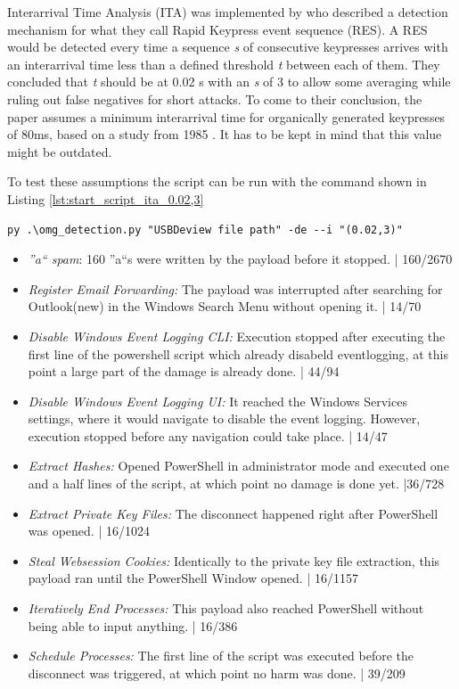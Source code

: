 Interarrival Time Analysis (ITA) was implemented by \cite{neunerUSBlockBlockingUSBBased2018} who described a detection mechanism for what they call Rapid Keypress event sequence (RES). A RES would be detected every time a sequence \emph{s} of consecutive keypresses arrives with an interarrival time less than a defined threshold \emph{t} between each of them. They concluded that \emph{t} should be at 0.02 s with an \emph{s} of 3 to allow some averaging while ruling out false negatives for short attacks. To come to their conclusion, the paper assumes a minimum interarrival time for organically generated keypresses of 80ms, based on a study from 1985 \cite{umphressIdentityVerificationKeyboard1985}. It has to be kept in mind that this value might be outdated.

To test these assumptions the script can be run with the command shown in Listing \ref{lst:start_script_ita_0.02,3}


\begin{lstlisting}[caption={start Defense Script with ITA (0.02,3)},label={lst:start_script_ita_0.02,3}, captionpos=b]
 py .\omg_detection.py "USBDeview file path" -de --i "(0.02,3)"
\end{lstlisting}

\begin{itemize}
    \item  \emph{''a`` spam}: 160 ''a``s were written by the payload before it stopped. | 160/2670
    \item  \emph{Register Email Forwarding:} The payload was interrupted after searching for Outlook(new) in the Windows Search Menu without opening it.  | 14/70 
    \item  \emph{Disable Windows Event Logging CLI:} Execution stopped after executing the first line of the powershell script which already disabeld eventlogging, at this point a large part of the damage is already done. | 44/94
    \item  \emph{Disable Windows Event Logging UI:} It reached the Windows Services settings, where it would navigate to disable the event logging. However, execution stopped before any navigation could take place.  | 14/47
    \item  \emph{Extract Hashes:} Opened PowerShell in administrator mode and executed one and a half lines of the script, at which point no damage is done yet. |36/728 
    \item  \emph{Extract Private Key Files:} The disconnect happened right after PowerShell was opened. | 16/1024
    \item  \emph{Steal Websession Cookies:} Identically to the private key file extraction, this payload ran until the PowerShell Window opened. | 16/1157
    \item  \emph{Iteratively End Processes:} This payload also reached PowerShell without being able to input anything. | 16/386
    \item  \emph{Schedule Processes:} The first line of the script was executed before the disconnect was triggered, at which point no harm was done. | 39/209
\end{itemize}

